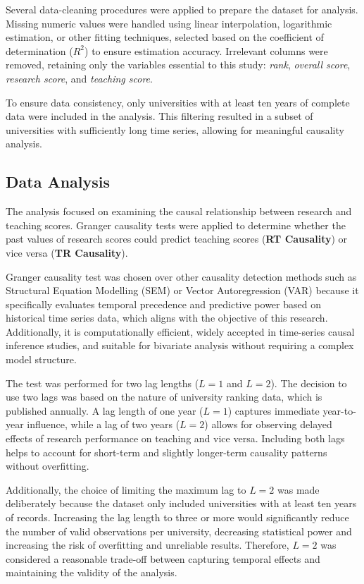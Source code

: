 \documentclass[a4paper, conference]{IEEEtran}
\begin{document}
Several data-cleaning procedures were applied to prepare the dataset for analysis. Missing numeric values were handled using linear interpolation, logarithmic estimation, or other fitting techniques, selected based on the coefficient of determination ($R^{2}$) to ensure estimation accuracy. Irrelevant columns were removed, retaining only the variables essential to this study: \textit{rank}, \textit{overall score}, \textit{research score}, and \textit{teaching score}.

To ensure data consistency, only universities with at least ten years of complete data were included in the analysis. This filtering resulted in a subset of universities with sufficiently long time series, allowing for meaningful causality analysis.

\subsection{Data Analysis}

The analysis focused on examining the causal relationship between research and teaching scores.  Granger causality tests \cite{granger1969investigating} were applied to determine whether the past values of research scores could predict teaching scores (\textbf{RT Causality}) or vice versa (\textbf{TR Causality}).

Granger causality test was chosen over other causality detection methods such as Structural Equation Modelling (SEM) or Vector Autoregression (VAR) because it specifically evaluates temporal precedence and predictive power based on historical time series data, which aligns with the objective of this research. Additionally, it is computationally efficient, widely accepted in time-series causal inference studies, and suitable for bivariate analysis without requiring a complex model structure.

The test was performed for two lag lengths ($L=1$ and $L=2$). The decision to use two lags was based on the nature of university ranking data, which is published annually. A lag length of one year ($L=1$) captures immediate year-to-year influence, while a lag of two years ($L=2$) allows for observing delayed effects of research performance on teaching and vice versa. Including both lags helps to account for short-term and slightly longer-term causality patterns without overfitting.

Additionally, the choice of limiting the maximum lag to $L=2$ was made deliberately because the dataset only included universities with at least ten years of records. Increasing the lag length to three or more would significantly reduce the number of valid observations per university, decreasing statistical power and increasing the risk of overfitting and unreliable results. Therefore, $L=2$ was considered a reasonable trade-off between capturing temporal effects and maintaining the validity of the analysis.
\end{document}
